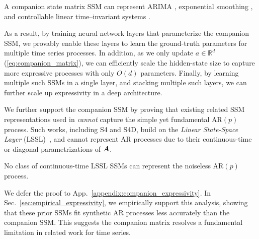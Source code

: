 \begin{prop}
    A companion state matrix SSM can represent ARIMA \citep{box1970time}, exponential smoothing \citep{winters1960forecasting,holt2004forecasting}, and controllable linear time--invariant systems \citep{chen1984linear}.
\label{prop:ssm_companion_expressiveness_td_bluf}
\end{prop}

%
As a result, by training neural network layers that parameterize the companion SSM, we provably enable these layers to learn the ground-truth parameters for multiple time series processes. In addition, as we only update $a\in \mathbb{R}^{d}$ (\ref{eq:companion_matrix}), we can efficiently scale the hidden-state size to capture more expressive processes with only $O(d)$ parameters. 
Finally, by learning multiple such SSMs in a single layer, and stacking multiple such layers, we can further scale up expressivity in a deep architecture. 

 We further support the companion SSM by proving that existing related SSM representations used in 
\cite{gu2021efficiently, gupta2022diagonal, smith2022simplified, alcaraz2022diffusion}
\emph{cannot} capture the simple yet fundamental $\text{AR}(p)$ process. Such works, including S4 and S4D, build on the \emph{Linear State-Space Layer} (LSSL)~\citep{gu2021combining}, and cannot represent AR processes due to their continuous-time or diagonal parametrizations of $\boldsymbol{A}$.
\begin{prop}
    No class of continuous-time LSSL SSMs can represent the noiseless $\text{AR}(p)$ process.  
\label{prop:continuous_ssm_no_ar_td_bluf}
\end{prop}
We defer the proof to App.~\ref{appendix:companion_expressivity}.
In Sec.~\ref{sec:empirical_expressivity}, we empirically support this analysis, showing that these prior SSMs fit synthetic AR processes less accurately than the companion SSM. This suggests the companion matrix resolves a fundamental limitation in related work for time series.
%

